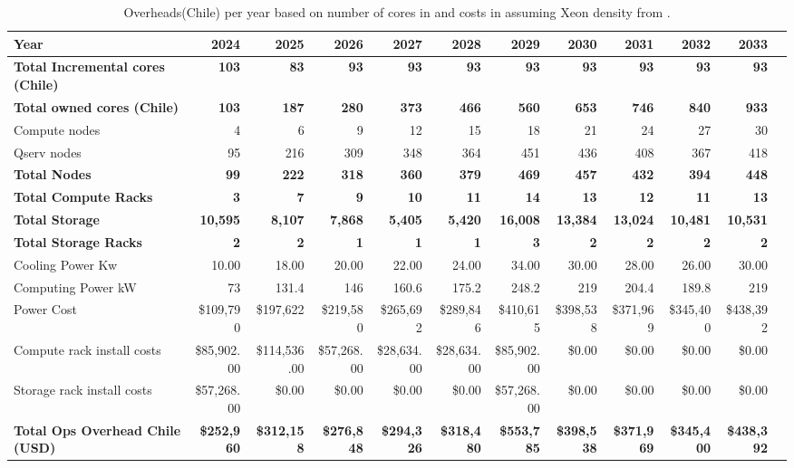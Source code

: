 \tiny \begin{longtable} { |p{}  |r  |r  |r  |r  |r  |r  |r  |r  |r  |r  |r |} 
\caption{Overheads(Chile) per year based on number of cores in  and costs in  assuming Xeon density from .  \label{tab:opsOverheadChile}}\\ 
\hline 
\textbf{Year}&\textbf{2024}&\textbf{2025}&\textbf{2026}&\textbf{2027}&\textbf{2028}&\textbf{2029}&\textbf{2030}&\textbf{2031}&\textbf{2032}&\textbf{2033} \\ \hline
\textbf{Total Incremental cores (Chile)}&\textbf{103}&\textbf{83}&\textbf{93}&\textbf{93}&\textbf{93}&\textbf{93}&\textbf{93}&\textbf{93}&\textbf{93}&\textbf{93} \\ \hline
\textbf{Total owned cores (Chile)}&\textbf{103}&\textbf{187}&\textbf{280}&\textbf{373}&\textbf{466}&\textbf{560}&\textbf{653}&\textbf{746}&\textbf{840}&\textbf{933} \\ \hline
{Compute nodes}&{4}&{6}&{9}&{12}&{15}&{18}&{21}&{24}&{27}&{30} \\ \hline
{Qserv nodes}&{95}&{216}&{309}&{348}&{364}&{451}&{436}&{408}&{367}&{418} \\ \hline
\textbf{Total Nodes}&\textbf{99}&\textbf{222}&\textbf{318}&\textbf{360}&\textbf{379}&\textbf{469}&\textbf{457}&\textbf{432}&\textbf{394}&\textbf{448} \\ \hline
\textbf{Total Compute Racks}&\textbf{3}&\textbf{7}&\textbf{9}&\textbf{10}&\textbf{11}&\textbf{14}&\textbf{13}&\textbf{12}&\textbf{11}&\textbf{13} \\ \hline
\textbf{Total Storage}&\textbf{10,595}&\textbf{8,107}&\textbf{7,868}&\textbf{5,405}&\textbf{5,420}&\textbf{16,008}&\textbf{13,384}&\textbf{13,024}&\textbf{10,481}&\textbf{10,531} \\ \hline
\textbf{Total Storage Racks}&\textbf{2}&\textbf{2}&\textbf{1}&\textbf{1}&\textbf{1}&\textbf{3}&\textbf{2}&\textbf{2}&\textbf{2}&\textbf{2} \\ \hline
{Cooling Power Kw}&{10.00}&{18.00}&{20.00}&{22.00}&{24.00}&{34.00}&{30.00}&{28.00}&{26.00}&{30.00} \\ \hline
{Computing Power kW
}&{73}&{131.4}&{146}&{160.6}&{175.2}&{248.2}&{219}&{204.4}&{189.8}&{219} \\ \hline
{Power Cost}&{\$109,790}&{\$197,622}&{\$219,580}&{\$265,692}&{\$289,846}&{\$410,615}&{\$398,538}&{\$371,969}&{\$345,400}&{\$438,392} \\ \hline
{Compute rack install costs}&{\$85,902.00}&{\$114,536.00}&{\$57,268.00}&{\$28,634.00}&{\$28,634.00}&{\$85,902.00}&{\$0.00}&{\$0.00}&{\$0.00}&{\$0.00} \\ \hline
{Storage rack install costs}&{\$57,268.00}&{\$0.00}&{\$0.00}&{\$0.00}&{\$0.00}&{\$57,268.00}&{\$0.00}&{\$0.00}&{\$0.00}&{\$0.00} \\ \hline
\textbf{Total Ops Overhead Chile (USD)}&\textbf{\$252,960}&\textbf{\$312,158}&\textbf{\$276,848}&\textbf{\$294,326}&\textbf{\$318,480}&\textbf{\$553,785}&\textbf{\$398,538}&\textbf{\$371,969}&\textbf{\$345,400}&\textbf{\$438,392} \\ \hline
\end{longtable} \normalsize
